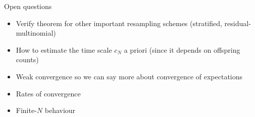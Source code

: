 \documentclass[aspectratio=169]{beamer}
\theoremstyle{definition}
\begin{document}
\begin{frame}{Open questions}
\begin{itemize}
\item Verify theorem for other important resampling schemes (stratified, residual-multinomial)
\item How to estimate the time scale $c_N$ a priori (since it depends on offspring counts)
\item Weak convergence so we can say more about convergence of expectations
\item Rates of convergence
\item Finite-$N$ behaviour
\end{itemize}
\end{frame}
\end{document}
